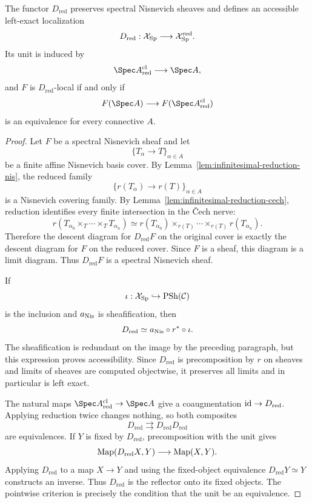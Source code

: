 \begin{proposition}
\label{prop:infinitesimal-reduced-localization}
The functor $D_{\mathrm{red}}$ preserves spectral Nisnevich sheaves and defines
an accessible left-exact localization
\[
    D_{\mathrm{red}}:
    \mathcal X_{\mathrm{Sp}}\longrightarrow\mathcal X_{\mathrm{Sp}}^{\mathrm{red}}.
\]
Its unit is induced by
\[
    \Spec A_{\mathrm{red}}^{\mathrm{cl}}
    \longrightarrow
    \Spec A,
\]
and $F$ is $D_{\mathrm{red}}$-local if and only if
\[
    F(\Spec A)
    \longrightarrow
    F(\Spec A_{\mathrm{red}}^{\mathrm{cl}})
\]
is an equivalence for every connective $A$.
\end{proposition}

\begin{proof}
Let $F$ be a spectral Nisnevich sheaf and let
\[
    \{T_\alpha\to T\}_{\alpha\in A}
\]
be a finite affine Nisnevich basis cover.  By
Lemma~\ref{lem:infinitesimal-reduction-nis}, the reduced family
\[
    \{r(T_\alpha)\to r(T)\}_{\alpha\in A}
\]
is a Nisnevich covering family.  By
Lemma~\ref{lem:infinitesimal-reduction-cech}, reduction identifies every
finite intersection in the \v{C}ech nerve:
\[
    r(T_{\alpha_0}\times_T\cdots\times_TT_{\alpha_n})
    \simeq
    r(T_{\alpha_0})
    \times_{r(T)}
    \cdots
    \times_{r(T)}
    r(T_{\alpha_n}).
\]
Therefore the descent diagram for $D_{\mathrm{red}}F$ on the original cover
is exactly the descent diagram for $F$ on the reduced cover.  Since $F$ is a
sheaf, this diagram is a limit diagram.  Thus $D_{\mathrm{red}}F$ is a
spectral Nisnevich sheaf.

If
\[
    \iota:\mathcal X_{\mathrm{Sp}}
    \hookrightarrow
    \operatorname{PSh}(\mathcal C)
\]
is the inclusion and $a_{\mathrm{Nis}}$ is sheafification, then
\[
    D_{\mathrm{red}}
    \simeq
    a_{\mathrm{Nis}}\circ r^*\circ\iota.
\]
The sheafification is redundant on the image by the preceding paragraph, but
this expression proves accessibility.  Since $D_{\mathrm{red}}$ is
precomposition by $r$ on sheaves and limits of sheaves are computed
objectwise, it preserves all limits and in particular is left exact.

The natural maps
$\Spec A_{\mathrm{red}}^{\mathrm{cl}}\to\Spec A$ give a coaugmentation
$\operatorname{id}\to D_{\mathrm{red}}$.  Applying reduction twice changes nothing, so both
composites
\[
    D_{\mathrm{red}}
    \rightrightarrows
    D_{\mathrm{red}}D_{\mathrm{red}}
\]
are equivalences.  If $Y$ is fixed by $D_{\mathrm{red}}$, precomposition with
the unit gives
\[
    \operatorname{Map}(D_{\mathrm{red}}X,Y)
    \longrightarrow
    \operatorname{Map}(X,Y).
\]
Applying $D_{\mathrm{red}}$ to a map $X\to Y$ and using the fixed-object
equivalence $D_{\mathrm{red}}Y\simeq Y$ constructs an inverse.  Thus
$D_{\mathrm{red}}$ is the reflector onto its fixed objects.  The pointwise
criterion is precisely the condition that the unit be an equivalence.
\end{proof}

